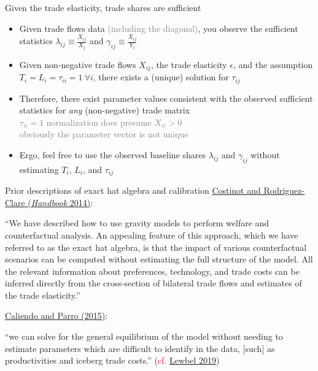 \documentclass[11pt,notes=hide,aspectratio=169]{beamer}
\begin{document}
\begin{frame}{Given the trade elasticity, trade shares are sufficient}
\begin{itemize}
\item
Given trade flows data \textcolor{gray}{(including the diagonal)},
you observe the sufficient statistics
$\lambda_{ij} \equiv \frac{X_{ij}}{X_j}$ and $\gamma_{ij} \equiv \frac{X_{ij}}{Y_i}$
\item
Given non-negative trade flows $X_{ij}$, the trade elasticity $\epsilon$, and
the assumption $T_i = L_i = \tau_{ii} = 1 \ \forall i$,
there exists a (unique) solution for $\tau_{ij}$
\item
Therefore,
there exist parameter values consistent with the observed sufficient statistics
for \textit{any} (non-negative) trade matrix
\\ \textcolor{gray}{$\tau_{ii} = 1$ normalization does presume $X_{ii} > 0$ \\ obviously the parameter vector is not unique}
\item
Ergo, feel free to use the observed baseline shares $\lambda_{ij}$ and $\gamma_{ij}$
without estimating $T_i$, $L_i$, and $\tau_{ij}$
\end{itemize}
\end{frame}
\begin{frame}{Prior descriptions of exact hat algebra and calibration}
\href{https://doi.org/10.1016/B978-0-444-54314-1.00004-5}{Costinot and Rodriguez-Clare (\textit{Handbook} 2014)}:\\
{\small
``We have described how to use gravity models to perform welfare and counterfactual analysis. An appealing feature of this approach, which we have referred to as the exact hat algebra, is that the impact of various counterfactual scenarios can be computed without estimating the full structure of the model. All the relevant information about preferences, technology, and trade costs can be inferred directly from the cross-section of bilateral trade flows and estimates of the trade elasticity.''
\par}
\vspace{3mm}
\href{https://doi.org/10.1093/restud/rdu035}{Caliendo and Parro (2015)}:\\
{\small
``we can solve for the general equilibrium of the model without needing to estimate parameters which are difficult to identify in the data, [such] as productivities and iceberg trade costs.''
(\textcolor{red}{cf.} \href{https://www.aeaweb.org/articles?id=10.1257/jel.20181361}{Lewbel 2019})
\par}
\end{frame}
\end{document}
